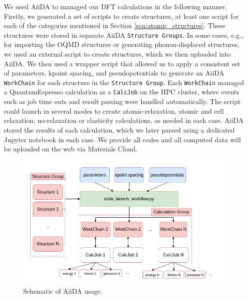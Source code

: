 \documentclass{article}
\begin{document}
We used AiiDA to managed our DFT calculations in the following manner.
Firstly, we generated a set of scripts to create structures, at least one script for each of the categories mentioned in Section \ref{scn:atomic_structures}.
These structures were stored in separate AiiDA \texttt{Structure Groups}.
In some cases, e.g., for importing the OQMD structures or generating phonon-displaced structures, we used an external script to create structures, which we then uploaded into AiiDA.
We then used a wrapper script that allowed us to apply a consistent set of parameters, kpoint spacing, and pseudopotentials to generate an AiiDA \texttt{WorkChain} for each structure in the \texttt{Structure Group}.
Each \texttt{WorkChain} managed a QuantumEspresso calculation as a \texttt{CalcJob} on the HPC cluster, 
where events such as job time outs and result parsing were handled automatically.
The script could launch in several modes to create atomic-relaxation, atomic and cell relaxation, no-relaxation or elasticity calculations, as needed in each case.
AiiDA stored the results of each calculation, which we later parsed using a dedicated Jupyter\cite{Kluyver2016} notebook in each case. 
We provide all codes and all computed data will be uploaded on the web via Materials Cloud\cite{Talirz2020MaterialsScience}.

\begin{figure}[H]%
\centering%
\includegraphics[width=1.0\textwidth,center]{figures/recalculateDBschematic.png}%
\caption{Schematic of AiiDA usage.
}
\label{fig:aiida_methods}
\end{figure}
\end{document}
